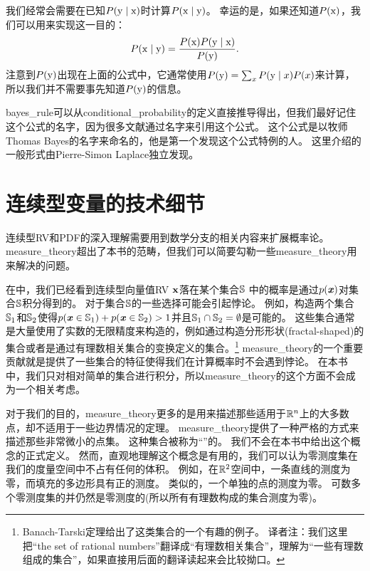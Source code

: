 \section{}
\label{sec:bayes_rule}

我们经常会需要在已知$P(\mathrm{y} \mid \mathrm{x})$时计算$P(\mathrm{x} \mid \mathrm{y})$。
幸运的是，如果还知道$P(\mathrm{x})$，我们可以用来实现这一目的：
\begin{equation}
P(\mathrm{x} \mid \mathrm{y}) = \frac{P(\mathrm{x}) P(\mathrm{y} \mid \mathrm{x})}{P(\mathrm{y})}.
\end{equation}
注意到$P(\mathrm{y})$出现在上面的公式中，它通常使用$P(\mathrm{y}) = \sum_x P(\mathrm{y} \mid x) P(x)$来计算，所以我们并不需要事先知道$P(\mathrm{y})$的信息。

\gls{bayes_rule}可以从\gls{conditional_probability}的定义直接推导得出，但我们最好记住这个公式的名字，因为很多文献通过名字来引用这个公式。
这个公式是以牧师Thomas Bayes的名字来命名的，他是第一个发现这个公式特例的人。
这里介绍的一般形式由Pierre-Simon Laplace独立发现。

\section{连续型变量的技术细节}
\label{sec:technical_details_of_continuous_variables}

连续型\gls{RV}和\gls{PDF}的深入理解需要用到数学分支的相关内容来扩展概率论。
\gls{measure_theory}超出了本书的范畴，但我们可以简要勾勒一些\gls{measure_theory}用来解决的问题。

在中，我们已经看到连续型向量值\gls{RV} $\mathbf{x}$落在某个集合$\mathbb{S}$ 中的概率是通过$p(\boldsymbol{\mathit{x}})$对集合$\mathbb{S}$积分得到的。
对于集合$\mathbb{S}$的一些选择可能会引起悖论。
例如，构造两个集合$\mathbb{S}_1$和$\mathbb{S}_2$使得$p(\boldsymbol{\mathit{x}}\in \mathbb{S}_1) + p(\boldsymbol{\mathit{x}}\in \mathbb{S}_2)>1$并且$\mathbb{S}_1 \cap \mathbb{S}_2 = \emptyset$是可能的。
这些集合通常是大量使用了实数的无限精度来构造的，例如通过构造分形形状(fractal-shaped)的集合或者是通过有理数相关集合的变换定义的集合。\footnote{Banach-Tarski定理给出了这类集合的一个有趣的例子。
译者注：我们这里把``the set of rational numbers''翻译成``有理数相关集合''，理解为``一些有理数组成的集合''，如果直接用后面的翻译读起来会比较拗口。}
\gls{measure_theory}的一个重要贡献就是提供了一些集合的特征使得我们在计算概率时不会遇到悖论。
在本书中，我们只对相对简单的集合进行积分，所以\gls{measure_theory}的这个方面不会成为一个相关考虑。


对于我们的目的，\gls{measure_theory}更多的是用来描述那些适用于$\mathbb{R}^n$上的大多数点，却不适用于一些边界情况的定理。
\gls{measure_theory}提供了一种严格的方式来描述那些非常微小的点集。
这种集合被称为``''的。
我们不会在本书中给出这个概念的正式定义。
然而，直观地理解这个概念是有用的，我们可以认为零测度集在我们的度量空间中不占有任何的体积。
例如，在$\mathbb{R}^2$空间中，一条直线的测度为零，而填充的多边形具有正的测度。
类似的，一个单独的点的测度为零。
可数多个零测度集的并仍然是零测度的(所以所有有理数构成的集合测度为零)。

